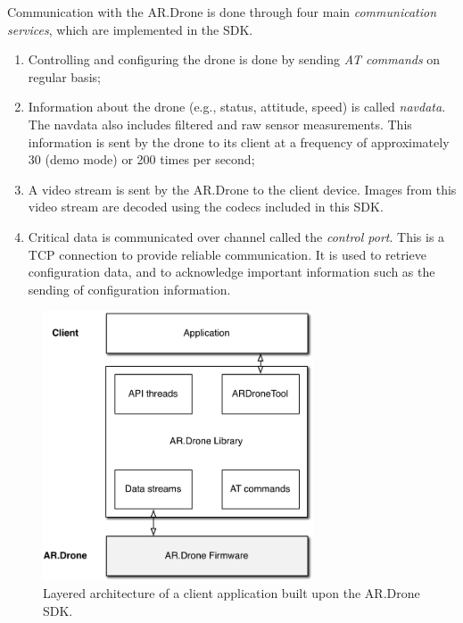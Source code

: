 Communication with the AR.Drone is done through four main \textit{communication services}, which are implemented in the SDK.
\begin{enumerate}
\item Controlling and configuring the drone is done by sending \textit{AT commands} on regular basis;
\item Information about the drone (e.g., status, attitude, speed) is called \textit{navdata}.
The navdata also includes filtered and raw sensor measurements.
This information is sent by the drone to its client at a frequency of approximately 30 (demo mode) or 200 times per second;
\item A video stream is sent by the AR.Drone to the client device.
Images from this video stream are decoded using the codecs included in this SDK.
\item Critical data is communicated over channel called the \textit{control port}.
This is a TCP connection to provide reliable communication.
It is used to retrieve configuration data, and to acknowledge important information such as the sending of configuration information.
\end{enumerate}

\begin{figure}[htb]
\centering
\includegraphics[height=8cm]{images/platform_ardroneapi.pdf}
\caption{Layered architecture of a client application built upon the AR.Drone SDK.}
\label{fig:platform-ardroneapi}
\end{figure}

